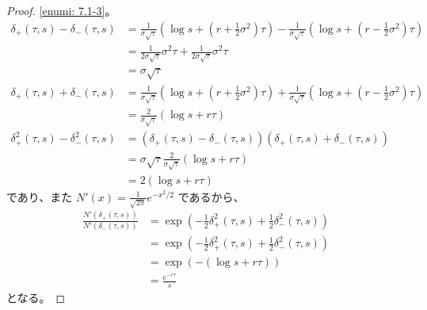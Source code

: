\documentclass[uplatex]{jsarticle}
\theoremstyle{definition}
\begin{document}
\begin{proof}
  \ref{enumi: 7.1-3}。
  \begin{align*}
    \delta_+(\tau,s) - \delta_-(\tau,s)
    &= \frac{1}{\sigma\sqrt{\tau}}\left( \log s + \left(
    r + \frac{1}{2}\sigma^2\right)\tau \right)
    - \frac{1}{\sigma\sqrt{\tau}}\left( \log s + \left(
    r - \frac{1}{2}\sigma^2\right)\tau \right) \\
    &= \frac{1}{2\sigma\sqrt{\tau}}\sigma^2\tau
    + \frac{1}{2\sigma\sqrt{\tau}}\sigma^2\tau \\
    &= \sigma\sqrt{\tau} \\
    \delta_+(\tau,s) + \delta_-(\tau,s)
    &= \frac{1}{\sigma\sqrt{\tau}}\left( \log s + \left(
    r + \frac{1}{2}\sigma^2\right)\tau \right)
    + \frac{1}{\sigma\sqrt{\tau}}\left( \log s + \left(
    r - \frac{1}{2}\sigma^2\right)\tau \right) \\
    &= \frac{2}{\sigma\sqrt{\tau}}\left( \log s + r\tau \right) \\
    \delta_+^2(\tau,s) - \delta_-^2(\tau,s)
    &= \left( \delta_+(\tau,s) - \delta_-(\tau,s) \right)
    \left( \delta_+(\tau,s) + \delta_-(\tau,s) \right) \\
    &= \sigma\sqrt{\tau}\frac{2}{\sigma\sqrt{\tau}}
    \left( \log s + r\tau \right) \\
    &= 2\left( \log s + r\tau \right)
  \end{align*}
  であり、また
  \(N'(x) = \frac{1}{\sqrt{2\pi}}e^{-x^2/2}\)
  であるから、
  \begin{align*}
    \frac{N'(\delta_+(\tau,s))}{N'(\delta_-(\tau,s))}
    &= \exp \left( - \frac{1}{2}\delta_+^2(\tau,s)
    + \frac{1}{2}\delta_-^2(\tau,s)\right) \\
    &= \exp \left( - \frac{1}{2}\delta_+^2(\tau,s)
    + \frac{1}{2}\delta_-^2(\tau,s)\right) \\
    &= \exp \left( -\left( \log s + r\tau \right) \right) \\
    &= \frac{e^{-r\tau}}{s}
  \end{align*}
  となる。


\end{proof}
\end{document}
